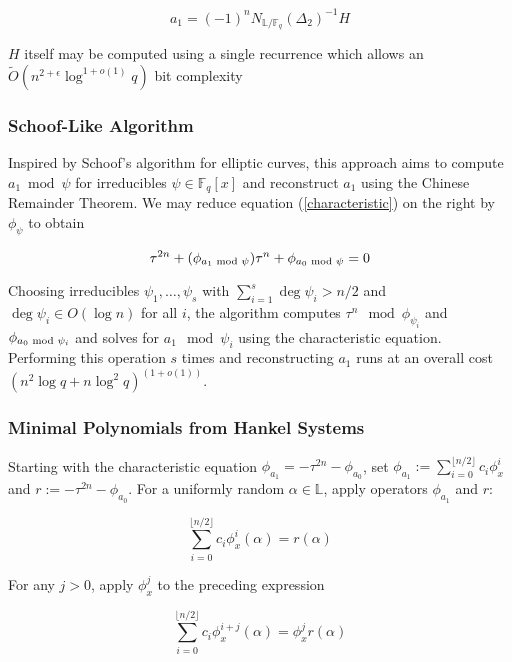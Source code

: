 \documentclass[sigconf]{acmart}
\newcommand{\F}{\mathbb{F}}
\renewcommand{\L}{\mathbb{L}}
\begin{document}
\begin{equation*}
    a_1 = (-1)^n N_{\L/\F_q}(\Delta_2)^{-1}H
\end{equation*}

$H$ itself may be computed using a single recurrence which allows an $\tilde{O}(n^{2 + \epsilon} \log^{1 + o(1)} q)$ bit complexity

\subsubsection{Schoof-Like Algorithm} Inspired by Schoof's algorithm for elliptic curves, this approach aims to compute $a_1 \bmod \psi$ for irreducibles $\psi \in \F_q[x]$ and reconstruct $a_1$ using the Chinese Remainder Theorem. We may reduce equation (\ref{characteristic}) on the right by $\phi_{\psi}$ to obtain

\begin{equation*}
    \tau^{2n} + (\phi_{a_1 \textnormal{ mod } \psi}) \tau^n + \phi_{a_0 \textnormal{ mod } \psi} = 0
\end{equation*}

Choosing irreducibles $\psi_1, \ldots, \psi_s$ with $\sum_{i=1}^s \deg \psi_i > n/2$ and $\deg \psi_i \in O(\log n)$ for all $i$, the algorithm computes $\tau^n \mod \phi_{\psi_i}$ and $\phi_{a_0 \textnormal{ mod } \psi_i}$ and solves for $a_1 \mod \psi_i$ using the characteristic equation. Performing this operation $s$ times and reconstructing $a_1$ runs at an overall cost $(n^2\log q + n \log^2 q)^{(1 + o(1))}$.

\subsubsection{Minimal Polynomials from Hankel Systems} Starting with the characteristic equation $\phi_{a_1} = -\tau^{2n} - \phi_{a_0}$, set $\phi_{a_1} := \sum_{i=0}^{\lfloor n/2 \rfloor} c_i\phi_{x}^i$ and $r := -\tau^{2n} - \phi_{a_0}$. For a uniformly random $\alpha \in \L$, apply operators $\phi_{a_1}$ and $r$:

\begin{equation*}
    \sum_{i=0}^{\lfloor n/2 \rfloor} c_i\phi_{x}^i(\alpha) = r(\alpha)
\end{equation*}

For any $j > 0$, apply $\phi_x^j$ to the preceding expression

\begin{equation*}
    \sum_{i=0}^{\lfloor n/2 \rfloor} c_i\phi_{x}^{i +j}(\alpha) = \phi_x^jr(\alpha)
\end{equation*}
\end{document}
